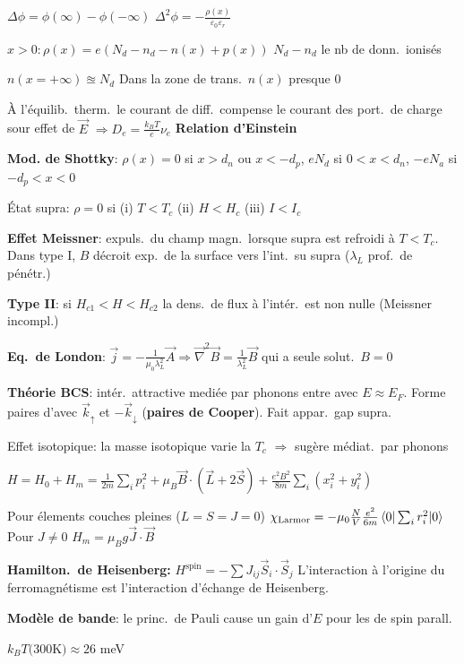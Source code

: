 \begin{squishlist}
    \item $\Delta \phi = \phi(\infty) - \phi(-\infty)$ \qquad $\Delta^2 \phi = - \frac{\rho(x)}{\varepsilon_0 \varepsilon_r}$
    \item $x>0 : \rho(x) = e (N_d - n_d - n(x) + p(x))$ \quad $N_d-n_d$ le nb de donn.\ ionisés
    \item $n(x=+\infty) \approxeq N_d$ \qquad Dans la zone de trans.\ $n(x)$ presque $0$
    \item À l'équilib.\ therm.\ le courant de diff.\ compense le courant des port.\ de charge sour effet de $\vec{E}$ $\Longrightarrow D_e = \frac{k_B T}{e} \nu_e$ \textbf{Relation d'Einstein}
    \item \textbf{Mod. de Shottky}: $\rho(x) = 0$ si $x>d_n$ ou $x < -d_p$, $eN_d$ si $0<x<d_n$, $-eN_a$ si $-d_p<x<0$
\end{squishlist}
\begin{squishlist}
    \item État supra: $\rho=0$ si (i) $T<T_c$ (ii) $H < H_c$ (iii) $I < I_c$
    \item \textbf{Effet Meissner}: expuls.\ du champ magn.\ lorsque supra est refroidi à $T<T_c$. \\
    Dans type I, $B$ décroit exp.\ de la surface vers l'int.\ su supra ($\lambda_L$ prof.\ de pénétr.)
    \item \textbf{Type II}: si $H_{c1}<H<H_{c2}$ la dens.\ de flux à l'intér.\ est non nulle (Meissner incompl.)
    \item \textbf{Eq.\ de London}: $\vec{j} = - \frac{1}{\mu_0 \lambda_L^2} \vec{A} \Longrightarrow \vec{\nabla}^2 \vec{B} = \frac{1}{\lambda_L^2}\vec{B}$ qui a seule solut.\ $B=0$
    \item \textbf{Théorie BCS}: intér.\ attractive mediée par phonons entre \elec avec $E\approx E_F$. Forme paires d'\elec avec $\vec{k}_{\uparrow}$ et $-\vec{k}_{\downarrow}$ (\textbf{paires de Cooper}). Fait appar.\ gap supra.
    \item Effet isotopique: la masse isotopique varie la $T_c$ $\Rightarrow$ sugère médiat.\ par phonons
\end{squishlist}

\begin{squishlist}
    \item $H = H_0 + H_m = \frac{1}{2m}\sum_i p_i^2 + \mu_B \vec{B} \cdot (\vec{L}+ 2 \vec{S}) + \frac{e^2 B^2}{8m} \sum_i (x_i^2 + y_i^2)$
    \item Pour élements couches pleines ($L=S=J=0$) $\chi_{\text{Larmor}} = -\mu_0 \frac{N}{V} \frac{e^2}{6m} \braket{0|\sum_i r_i^2|0}$ \\
    Pour $J\neq0$ $H_m = \mu_B g \vec{J} \cdot \vec{B}$ 
    \item \textbf{Hamilton.\ de Heisenberg:} $H^{\text{spin}} = - \sum J_{ij} \vec{S}_i \cdot \vec{S}_j$  L’interaction à l’origine du ferromagnétisme est l’interaction d’échange de Heisenberg.
    \item \textbf{Modèle de bande}: le princ.\ de Pauli cause un gain d'$E$ pour les \elec de spin parall.\
\end{squishlist}


\begin{squishlist}
    \item $k_B T (300$K$) \approx 26$ meV
\end{squishlist}